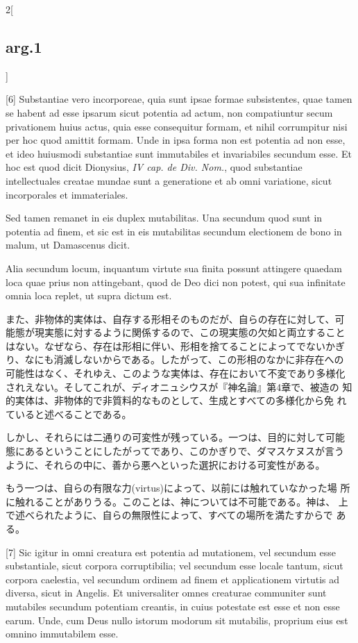 \documentclass[paper=a4paper,fontsize=10pt,jafontsize=9pt,titlepage]{jlreq}
\begin{document}
\begin{paracol}{2}[\subsection{arg.1}]
\switchcolumn*

[6] Substantiae vero incorporeae, quia sunt ipsae formae subsistentes,
quae tamen se habent ad esse ipsarum sicut potentia ad actum, non
compatiuntur secum privationem huius actus, quia esse consequitur
formam, et nihil corrumpitur nisi per hoc quod amittit formam. Unde in
ipsa forma non est potentia ad non esse, et ideo huiusmodi substantiae
sunt immutabiles et invariabiles secundum esse. Et hoc est quod dicit
Dionysius, {\itshape IV cap. de Div. Nom.}, quod substantiae intellectuales
creatae mundae sunt a generatione et ab omni variatione, sicut
incorporales et immateriales.

Sed tamen remanet in eis duplex mutabilitas. Una secundum quod sunt in
potentia ad finem, et sic est in eis mutabilitas secundum electionem
de bono in malum, ut Damascenus dicit.

Alia secundum locum, inquantum virtute sua finita possunt attingere
quaedam loca quae prius non attingebant, quod de Deo dici non potest,
qui sua infinitate omnia loca replet, ut supra dictum est.

\switchcolumn

また、非物体的実体は、自存する形相そのものだが、自らの存在に対して、可
能態が現実態に対するように関係するので、この現実態の欠如と両立すること
はない。なぜなら、存在は形相に伴い、形相を捨てることによってでないかぎ
り、なにも消滅しないからである。したがって、この形相のなかに非存在への
可能性はなく、それゆえ、このような実体は、存在において不変であり多様化
されえない。そしてこれが、ディオニュシウスが『神名論』第4章で、被造の
知的実体は、非物体的で非質料的なものとして、生成とすべての多様化から免
れていると述べることである。

しかし、それらには二通りの可変性が残っている。一つは、目的に対して可能
態にあるということにしたがってであり、このかぎりで、ダマスケヌスが言う
ように、それらの中に、善から悪へといった選択における可変性がある。

もう一つは、自らの有限な力(virtus)によって、以前には触れていなかった場
所に触れることがありうる。このことは、神については不可能である。神は、
上で述べられたように、自らの無限性によって、すべての場所を満たすからで
ある。

\switchcolumn*

[7] Sic igitur in omni creatura est potentia ad mutationem, vel secundum
esse substantiale, sicut corpora corruptibilia; vel secundum esse
locale tantum, sicut corpora caelestia, vel secundum ordinem ad finem
et applicationem virtutis ad diversa, sicut in Angelis.
Et universaliter omnes creaturae communiter sunt mutabiles secundum
potentiam creantis, in cuius potestate est esse et non esse
earum. Unde, cum Deus nullo istorum modorum sit mutabilis, proprium
eius est omnino immutabilem esse.


\end{paracol}
\end{document}
